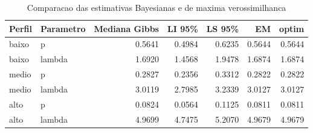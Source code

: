 \begin{table}

\caption{Comparacao das estimativas Bayesianas e de maxima verossimilhanca}
\centering
\begin{tabular}[t]{llrrrrr}
\toprule
Perfil & Parametro & Mediana Gibbs & LI 95\% & LS 95\% & EM & optim\\
\midrule
baixo & p & 0.5641 & 0.4984 & 0.6235 & 0.5644 & 0.5644\\
baixo & lambda & 1.6920 & 1.4568 & 1.9478 & 1.6874 & 1.6874\\
medio & p & 0.2827 & 0.2356 & 0.3312 & 0.2822 & 0.2822\\
medio & lambda & 3.0119 & 2.7985 & 3.2339 & 3.0127 & 3.0127\\
alto & p & 0.0824 & 0.0564 & 0.1125 & 0.0811 & 0.0811\\
\addlinespace
alto & lambda & 4.9699 & 4.7475 & 5.2070 & 4.9679 & 4.9679\\
\bottomrule
\end{tabular}
\end{table}
